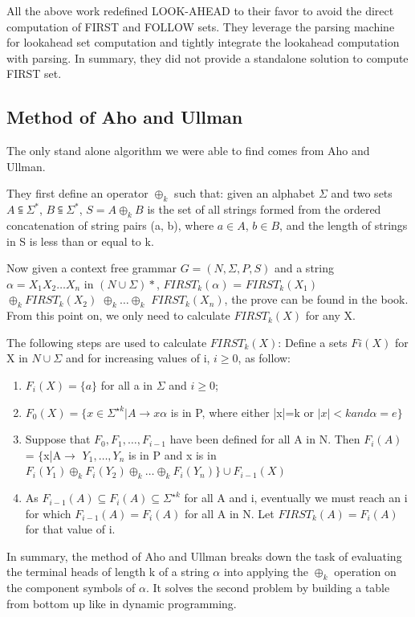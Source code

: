 \documentclass{sig-alternate-05-2015}
\begin{document}
All the above work redefined LOOK-AHEAD to their favor to avoid the direct computation of FIRST and FOLLOW sets. 
They leverage the parsing machine for lookahead set computation and tightly integrate the lookahead computation with parsing. 
In summary, they did not provide a standalone solution to compute FIRST set.

\subsection{Method of Aho and Ullman}
The only stand alone algorithm we were able to find comes from
Aho and Ullman\cite{aho72parsing}. 

They first define an operator $\oplus_k$ such that: given an alphabet $\Sigma$ and
two sets $A \subseteqq \Sigma^*$, $B \subseteqq \Sigma^*$, $S = A \oplus_k B$ 
is the set of all
strings formed from the ordered concatenation of string
pairs (a, b), where $a \in A$, $b \in B$, and the length of strings in
S is less than or equal to k.

Now given a context free grammar $G = (N, \Sigma, P, S)$ and
a string $ \alpha = X_1X_2…X_n$ in $(N \cup \Sigma)*$, 
$FIRST_k(\alpha)$ =
$FIRST_k(X_1)$ $\oplus_k FIRST_k(X_2)$ $\oplus_k \ldots \oplus_k$ $FIRST_k(X_n)$, the prove can be found in the book.
From this point on, we only need to calculate $FIRST_k(X)$ for any X.

The following steps are used to calculate $FIRST_k(X)$:
Define a sets $Fi(X)$ for X in $N \cup \Sigma$ and for increasing values of i, $i \geq 0$, as follow:
\begin{enumerate}  
\item $F_i(X) = \{a\}$ for all a in $\Sigma$ and $i \geq 0$;
\item 
$ F_0(X) = \{x \in \Sigma^{\star k} | A \rightarrow x\alpha$ is in P, where either |x|=k or $|x| < k and \alpha = e \}$
\item
Suppose that $F_0, F_1, \ldots, F_{i-1}$ have been defined for all A in N. Then
$F_i(A)$ = $\{$x|A$\rightarrow$ $Y_1,\ldots,Y_n$ is in P and x is in $F_i(Y_1) \oplus_k F_i(Y_2) \oplus_k \ldots \oplus_k F_i(Y_n)\} \cup F_{i-1}(X)$
\item
As $F_{i-1}(A) \subseteq F_i(A) \subseteq \Sigma^{\star k}$ for all A and i, eventually we must reach an i for which $F_{i-1}(A) = F_i(A)$ for all A in N.
Let $FIRST_k(A)=F_i(A)$ for that value of i.
\end{enumerate}

In summary, the method of Aho and Ullman breaks
down the task of evaluating the terminal heads of length k
of a string $\alpha$ into applying the $\oplus_k$ operation on the component
symbols of $\alpha$. It solves the second problem by building
a table from bottom up like in dynamic programming.
\end{document}
